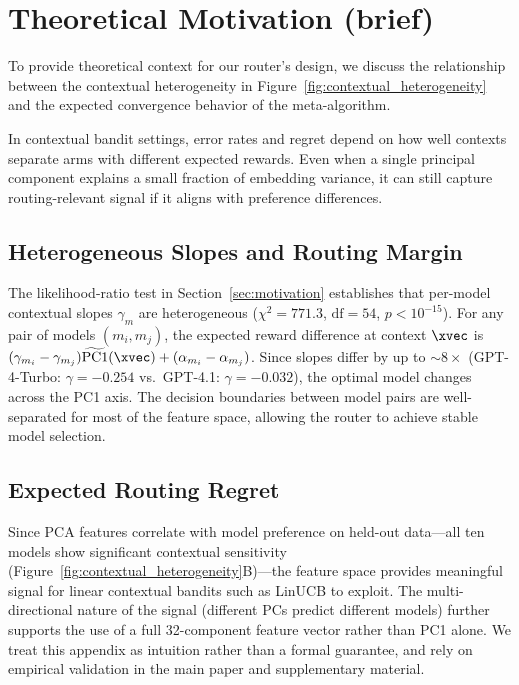 \appendix

\section{Theoretical Motivation (brief)}
\label{appendix:spectral_separation}

To provide theoretical context for our router's design, we discuss the relationship between the contextual heterogeneity in Figure~\ref{fig:contextual_heterogeneity} and the expected convergence behavior of the meta-algorithm.

In contextual bandit settings, error rates and regret depend on how well contexts separate arms with different expected rewards. Even when a single principal component explains a small fraction of embedding variance, it can still capture routing-relevant signal if it aligns with preference differences.

\subsection{Heterogeneous Slopes and Routing Margin}

The likelihood-ratio test in Section~\ref{sec:motivation} establishes that per-model contextual slopes $\gamma_m$ are heterogeneous ($\chi^2 = 771.3$, $\text{df}{=}54$, $p < 10^{-15}$). For any pair of models $(m_i, m_j)$, the expected reward difference at context $\xvec$ is $(\gamma_{m_i} - \gamma_{m_j}) \widetilde{\text{PC1}}(\xvec) + (\alpha_{m_i} - \alpha_{m_j})$. Since slopes differ by up to ${\sim}8\times$ (GPT-4-Turbo: $\gamma = -0.254$ vs.\ GPT-4.1: $\gamma = -0.032$), the optimal model changes across the PC1 axis. The decision boundaries between model pairs are well-separated for most of the feature space, allowing the router to achieve stable model selection.

\subsection{Expected Routing Regret}

Since PCA features correlate with model preference on held-out data---all ten models show significant contextual sensitivity (Figure~\ref{fig:contextual_heterogeneity}B)---the feature space provides meaningful signal for linear contextual bandits such as LinUCB to exploit. The multi-directional nature of the signal (different PCs predict different models) further supports the use of a full 32-component feature vector rather than PC1 alone. We treat this appendix as intuition rather than a formal guarantee, and rely on empirical validation in the main paper and supplementary material.
